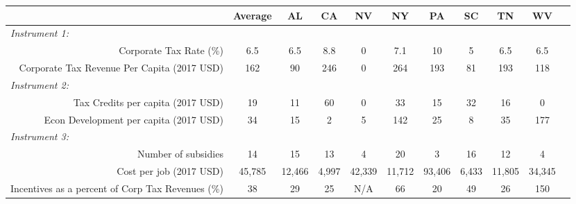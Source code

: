 \begin{tabular}{r*{10}{c}}
\toprule
 & Average & AL & CA & NV & NY & PA & SC & TN & WV\\
  \midrule 
\multicolumn{10}{l}{\textit{Instrument 1:}}\\
Corporate Tax Rate (\%)&6.5&6.5&8.8&0&7.1&10&5&6.5&6.5\\
Corporate Tax Revenue Per Capita (2017 USD)&162&90&246&0&264&193&81&193&118\\
\multicolumn{10}{l}{\textit{Instrument 2:}}\\
Tax Credits per capita (2017 USD)&19&11&60&0&33&15&32&16&0\\
Econ Development per capita (2017 USD)&34&15&2&5&142&25&8&35&177\\
\multicolumn{10}{l}{\textit{Instrument 3:}}\\
Number of subsidies&14&15&13&4&20&3&16&12&4\\
Cost per job (2017 USD)&45,785&12,466&4,997&42,339&11,712&93,406&6,433&11,805&34,345\\
  \midrule 
Incentives as a percent of Corp Tax Revenues (\%)&38&29&25&N/A&66&20&49&26&150\\
  \bottomrule
\end{tabular}
